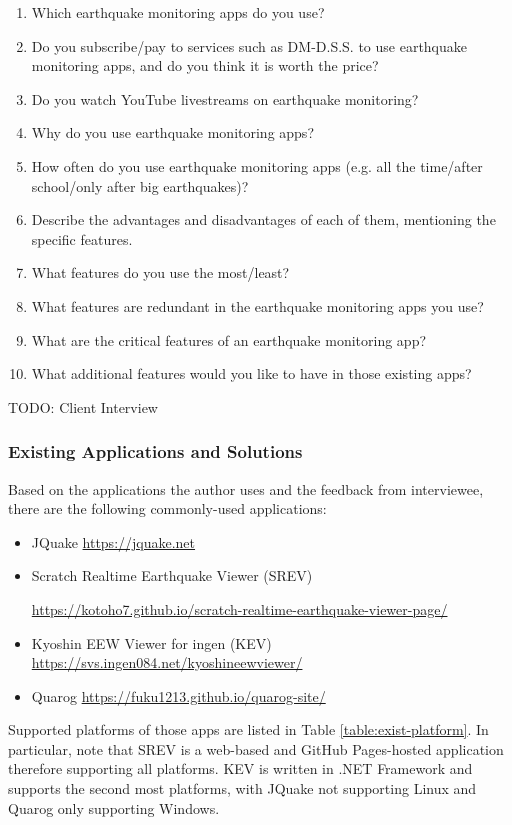 \documentclass{article}
\begin{document}
\begin{enumerate}
    \item Which earthquake monitoring apps do you use?
    \item Do you subscribe/pay to services such as DM-D.S.S. to use earthquake monitoring apps, and do you think it is worth the price?
    \item Do you watch YouTube livestreams on earthquake monitoring?
    \item Why do you use earthquake monitoring apps?
    \item How often do you use earthquake monitoring apps (e.g. all the time/after school/only after big earthquakes)?
    \item Describe the advantages and disadvantages of each of them, mentioning the specific features.
    \item What features do you use the most/least?
    \item What features are redundant in the earthquake monitoring apps you use?
    \item What are the critical features of an earthquake monitoring app?
    \item What additional features would you like to have in those existing apps?
\end{enumerate}

TODO: Client Interview

\subsubsection{Existing Applications and Solutions}

Based on the applications the author uses and the feedback from interviewee, there are the following commonly-used applications:
\begin{itemize}
    \item JQuake \url{https://jquake.net}
    \item Scratch Realtime Earthquake Viewer (SREV)

          \url{https://kotoho7.github.io/scratch-realtime-earthquake-viewer-page/}
    \item Kyoshin EEW Viewer for ingen (KEV) \url{https://svs.ingen084.net/kyoshineewviewer/}
    \item Quarog \url{https://fuku1213.github.io/quarog-site/}
\end{itemize}

Supported platforms of those apps are listed in Table \ref{table:exist-platform}. In particular, note that SREV is a web-based and GitHub Pages-hosted application therefore supporting all platforms. KEV is written in .NET Framework and supports the second most platforms, with JQuake not supporting Linux and Quarog only supporting Windows.
\end{document}
